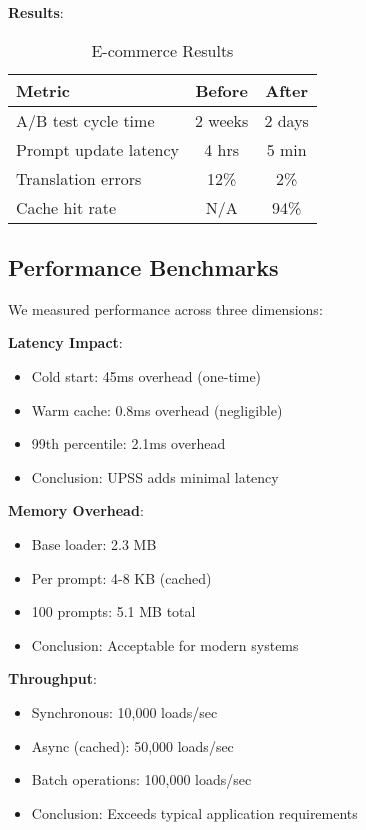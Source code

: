 \textbf{Results}:
\begin{table}[h]
\centering
\caption{E-commerce Results}
\begin{tabular}{@{}lcc@{}}
\toprule
\textbf{Metric} & \textbf{Before} & \textbf{After} \\ \midrule
A/B test cycle time & 2 weeks & 2 days \\
Prompt update latency & 4 hrs & 5 min \\
Translation errors & 12\% & 2\% \\
Cache hit rate & N/A & 94\% \\
\bottomrule
\end{tabular}
\end{table}

\subsection{Performance Benchmarks}

We measured performance across three dimensions:

\textbf{Latency Impact}:
\begin{itemize}
    \item Cold start: 45ms overhead (one-time)
    \item Warm cache: 0.8ms overhead (negligible)
    \item 99th percentile: 2.1ms overhead
    \item Conclusion: UPSS adds minimal latency
\end{itemize}

\textbf{Memory Overhead}:
\begin{itemize}
    \item Base loader: 2.3 MB
    \item Per prompt: 4-8 KB (cached)
    \item 100 prompts: 5.1 MB total
    \item Conclusion: Acceptable for modern systems
\end{itemize}

\textbf{Throughput}:
\begin{itemize}
    \item Synchronous: 10,000 loads/sec
    \item Async (cached): 50,000 loads/sec
    \item Batch operations: 100,000 loads/sec
    \item Conclusion: Exceeds typical application requirements
\end{itemize}

